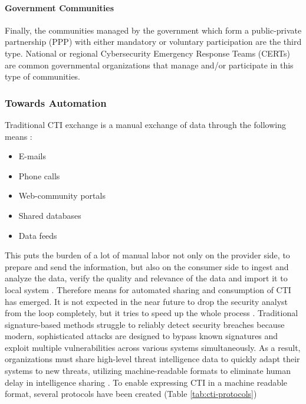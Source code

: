 \paragraph{Government Communities}
Finally, the communities managed by the government which form a public-private partnership (PPP) with either mandatory or voluntary participation are the third type. National or regional Cybersecurity Emergency Response Teams (CERTs) are common governmental organizations that manage and/or participate in this type of communities.

\subsubsection{Towards Automation}
\label{subsubsec:cti-channels}
Traditional CTI exchange is a manual exchange of data through the following means \cite{wagner_cyber_2019}:

\begin{itemize}
    \item E-mails
    \item Phone calls
    \item Web-community portals
    \item Shared databases
    \item Data feeds
\end{itemize}
This puts the burden of a lot of manual labor not only on the provider side, to prepare and send the information, but also on the consumer side to ingest and analyze the data, verify the quality and relevance of the data and import it to local system \cite{wagner_cyber_2019}. 
Therefore means for automated sharing and consumption of CTI has emerged. It is not expected in the near future to drop the security analyst from the loop completely, but it tries to speed up the whole process \cite{wagner_cyber_2019}.
Traditional signature-based methods struggle to reliably detect security breaches because modern, sophisticated attacks are designed to bypass known signatures and exploit multiple vulnerabilities across various systems simultaneously. As a result, organizations must share high-level threat intelligence data to quickly adapt their systems to new threats, utilizing machine-readable formats to eliminate human delay in intelligence sharing \cite{skopik_problem_2016}. To enable expressing CTI in a machine readable format, several protocols have been created  (Table \ref{tab:cti-protocols})

